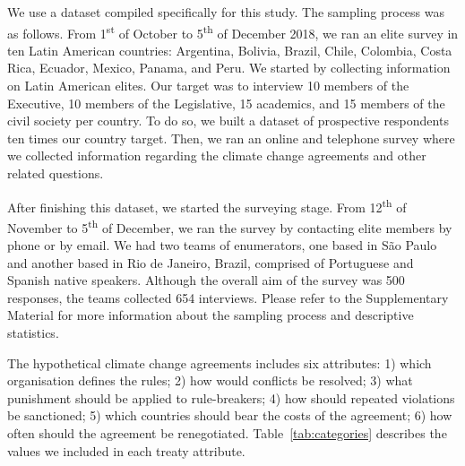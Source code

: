 \documentclass[a4paper,12pt]{article}
\begin{document}
We use a dataset compiled specifically for this study. The sampling process was as follows. From 1\textsuperscript{st} of October to 5\textsuperscript{th} of December 2018, we ran an elite survey in ten Latin American countries: Argentina, Bolivia, Brazil, Chile, Colombia, Costa Rica, Ecuador, Mexico, Panama, and Peru. We started by collecting information on Latin American elites. Our target was to interview 10 members of the Executive, 10 members of the Legislative, 15 academics, and 15 members of the civil society per country. To do so, we built a dataset of prospective respondents ten times our country target. Then, we ran an online and telephone survey where we collected information regarding the climate change agreements and other related questions.

After finishing this dataset, we started the surveying stage. From 12\textsuperscript{th} of November to 5\textsuperscript{th} of December, we ran the survey by contacting elite members by phone or by email. We had two teams of enumerators, one based in S\~{a}o Paulo and another based in Rio de Janeiro, Brazil, comprised of Portuguese and Spanish native speakers. Although the overall aim of the survey was 500 responses, the teams collected 654 interviews. Please refer to the Supplementary Material for more information about the sampling process and descriptive statistics.

The hypothetical climate change agreements includes six attributes: 1) which organisation defines the rules; 2) how would conflicts be resolved; 3) what punishment should be applied to rule-breakers; 4) how should repeated violations be sanctioned; 5) which countries should bear the costs of the agreement; 6) how often should the agreement be renegotiated. Table~\ref{tab:categories} describes the values we included in each treaty attribute. \\

\newpage 
\end{document}
